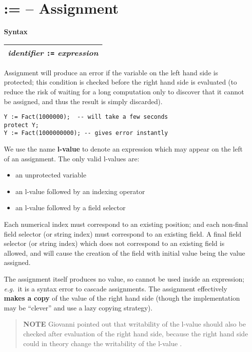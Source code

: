 \documentclass{book}[12,a4paper]
\def\eg{{\it e.g.}}
\newenvironment{syntax}
{\goodbreak\noindent\textbf{Syntax}\\
 \begin{tabular}{|p{0.9\textwidth}|}\hline}
{\\\hline\end{tabular}}
\begin{document}
\section{\textbf{:=} -- Assignment}

\begin{syntax}
\textit{identifier} \texttt{:=} \textit{expression}
\end{syntax}

Assignment will produce an error if the variable on the left hand side is
protected; this condition is checked before the right hand side is
evaluated (to reduce the risk of waiting for a long computation only to
discover that it cannot be assigned, and thus the result is simply discarded).
\begin{lstlisting}
Y := Fact(1000000);  -- will take a few seconds
protect Y;
Y := Fact(1000000000); -- gives error instantly
\end{lstlisting}

We use the name \textbf{l-value} to denote an expression which may appear
on the left of an assignment.  The only valid l-values are:
\begin{itemize}
\item an unprotected variable
\item an l-value followed by an indexing operator
\item an l-value followed by a field selector
\end{itemize}
Each numerical index must correspond to an existing position; and each
non-final field selector (or string index) must correspond to an existing
field.  A final field selector (or string index) which does not correspond
to an existing field is allowed, and will cause the creation of the field
with initial value being the value assigned.

The assignment itself produces no value, so cannot be used inside an
expression; \eg~it is a syntax error to cascade assignments.  The
assignment effectively \textbf{makes a copy} of the value of the right hand
side (though the implementation may be ``clever'' and use a lazy copying
strategy).

\begin{quote}
  \textbf{NOTE}
  Giovanni pointed out that writability of the l-value should also be checked
  after evaluation of the right hand side, because the right hand side could
  in theory change the writability of the l-value .
\end{quote}
\end{document}
